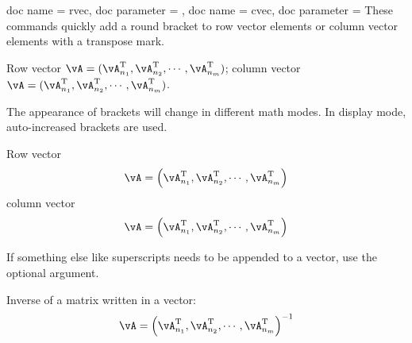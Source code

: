 \documentclass{article}
\begin{document}
\begin{docCommands}{
    {doc name = rvec, doc parameter = },
    {doc name = cvec, doc parameter = }
}
These commands quickly add a round bracket to row vector elements or column vector elements with a transpose mark.
\begin{dispExample}
Row vector $\vA = \rvec{\vA_{n_1}\T,\vA_{n_2}\T,\cdots,\vA_{n_m}\T}$;
column vector $\vA = \cvec{\vA_{n_1}\T,\vA_{n_2}\T,\cdots,\vA_{n_m}\T}$.
\end{dispExample}
The appearance of brackets will change in different math modes. 
In display mode, auto-increased brackets are used.
\begin{dispExample}
Row vector $$\vA = \rvec{\vA_{n_1}\T,\vA_{n_2}\T,\cdots,\vA_{n_m}\T}$$
column vector $$\vA = \cvec{\vA_{n_1}\T,\vA_{n_2}\T,\cdots,\vA_{n_m}\T}$$
\end{dispExample}
If something else like superscripts needs to be appended to a vector, use the optional argument.
\begin{dispExample}
Inverse of a matrix written in a vector: $$\vA = \rvec{\vA_{n_1}\T,\vA_{n_2}\T,\cdots,\vA_{n_m}\T}[\I]$$
\end{dispExample}
\end{docCommands}
\end{document}
